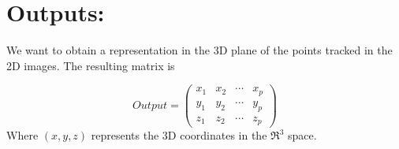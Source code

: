 \section{Outputs:}
We want to obtain a representation in the 3D plane of the points tracked in the 2D images. The resulting matrix is

\begin{equation}
Output=
\begin{pmatrix}
x_{1} & x_{2} & \cdots & x_{p}\\
y_{1} & y_{2} & \cdots & y_{p}\\
z_{1} & z_{2} & \cdots & z_{p}
\end{pmatrix}
\end{equation}
Where $(x,y,z)$ represents the 3D coordinates in the $\Re^{3}$ space.
